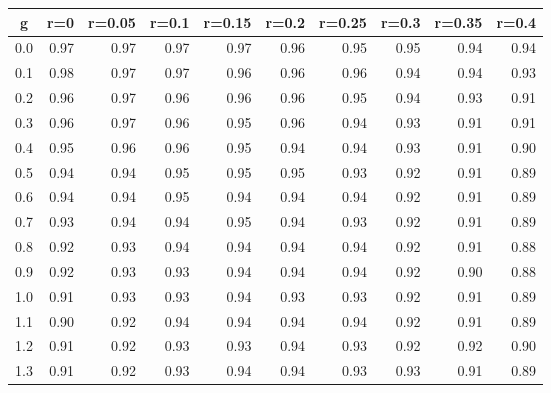 %
\begin{table}[!tbp]
 \begin{center}
 \begin{tabular}{rrrrrrrrrr}\hline\hline
\multicolumn{1}{c}{g}&\multicolumn{1}{c}{r=0}&\multicolumn{1}{c}{r=0.05}&\multicolumn{1}{c}{r=0.1}&\multicolumn{1}{c}{r=0.15}&\multicolumn{1}{c}{r=0.2}&\multicolumn{1}{c}{r=0.25}&\multicolumn{1}{c}{r=0.3}&\multicolumn{1}{c}{r=0.35}&\multicolumn{1}{c}{r=0.4}\tabularnewline
\hline
0.0&0.97&0.97&0.97&0.97&0.96&0.95&0.95&0.94&0.94\tabularnewline
0.1&0.98&0.97&0.97&0.96&0.96&0.96&0.94&0.94&0.93\tabularnewline
0.2&0.96&0.97&0.96&0.96&0.96&0.95&0.94&0.93&0.91\tabularnewline
0.3&0.96&0.97&0.96&0.95&0.96&0.94&0.93&0.91&0.91\tabularnewline
0.4&0.95&0.96&0.96&0.95&0.94&0.94&0.93&0.91&0.90\tabularnewline
0.5&0.94&0.94&0.95&0.95&0.95&0.93&0.92&0.91&0.89\tabularnewline
0.6&0.94&0.94&0.95&0.94&0.94&0.94&0.92&0.91&0.89\tabularnewline
0.7&0.93&0.94&0.94&0.95&0.94&0.93&0.92&0.91&0.89\tabularnewline
0.8&0.92&0.93&0.94&0.94&0.94&0.94&0.92&0.91&0.88\tabularnewline
0.9&0.92&0.93&0.93&0.94&0.94&0.94&0.92&0.90&0.88\tabularnewline
1.0&0.91&0.93&0.93&0.94&0.93&0.93&0.92&0.91&0.89\tabularnewline
1.1&0.90&0.92&0.94&0.94&0.94&0.94&0.92&0.91&0.89\tabularnewline
1.2&0.91&0.92&0.93&0.93&0.94&0.93&0.92&0.92&0.90\tabularnewline
1.3&0.91&0.92&0.93&0.94&0.94&0.93&0.93&0.91&0.89\tabularnewline
\hline
\end{tabular}

\end{center}

\end{table}

